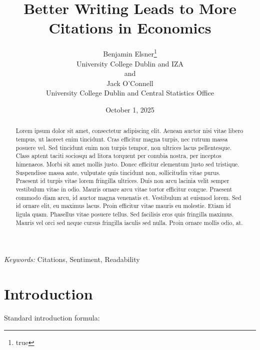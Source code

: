 \documentclass[
  12pt]{article}
\begin{document}
\def\spacingset#1{\renewcommand{\baselinestretch}%
{#1}\small\normalsize} \spacingset{1}



\date{October 1, 2025}
\title{\bf Better Writing Leads to More Citations in Economics}
\author{
Benjamin Elsner\thanks{true}\\
University College Dublin and IZA\\
and\\Jack O'Connell\\
University College Dublin and Central Statistics Office\\
}
\maketitle

\bigskip
\bigskip
\begin{abstract}
Lorem ipsum dolor sit amet, consectetur adipiscing elit. Aenean auctor
nisi vitae libero tempus, ut laoreet enim tincidunt. Cras efficitur
magna turpis, nec rutrum massa posuere vel. Sed tincidunt enim non
turpis tempor, non ultrices lacus pellentesque. Class aptent taciti
sociosqu ad litora torquent per conubia nostra, per inceptos himenaeos.
Morbi sit amet mollis justo. Donec efficitur elementum justo sed
tristique. Suspendisse massa ante, vulputate quis tincidunt non,
sollicitudin vitae purus. Praesent id turpis vitae lorem fringilla
ultrices. Duis non arcu lacinia velit semper vestibulum vitae in odio.
Mauris ornare arcu vitae tortor efficitur congue. Praesent commodo diam
arcu, id auctor magna venenatis et. Vestibulum at euismod lorem. Sed id
ornare elit, eu maximus lacus. Proin efficitur vitae mauris eu molestie.
Etiam id ligula quam. Phasellus vitae posuere tellus. Sed facilisis eros
quis fringilla maximus. Mauris vel orci sed neque cursus fringilla
iaculis sed nulla. Proin ornare mollis odio, at.
\end{abstract}

\noindent%
{\it Keywords:} Citations, Sentiment, Readability
\vfill

\newpage
\spacingset{1.9} %


\section{Introduction}\label{sec-intro}

Standard introduction formula:
\end{document}
